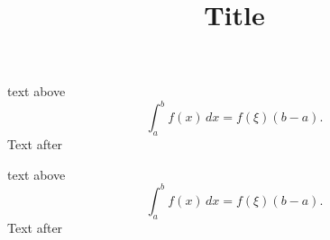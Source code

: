 \documentclass{beamer}
\title{Title}
\begin{document}
\begin{frame}
text above 
\[
    \int_a^b f(x)\,dx= f(\xi)(b-a).
\] 
Text after
\end{frame}

\begin{frame}
\setlength{\abovedisplayshortskip}{-1pt}
\setlength{\belowdisplayshortskip}{0pt} 
text above 
\[
    \int_a^b f(x)\,dx= f(\xi)(b-a).
\]
Text after
\end{frame}
\end{document}
